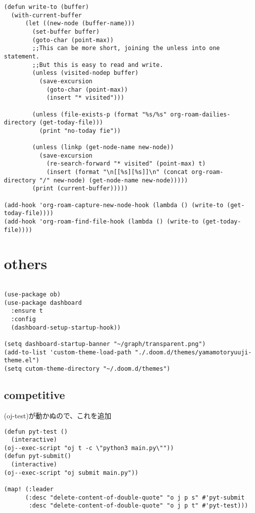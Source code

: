 \documentclass[11pt]{article}
\begin{document}
\begin{verbatim}
(defun write-to (buffer)
  (with-current-buffer
      (let ((new-node (buffer-name)))
        (set-buffer buffer)
        (goto-char (point-max))
        ;;This can be more short, joining the unless into one statement.
        ;;But this is easy to read and write.
        (unless (visited-nodep buffer)
          (save-excursion
            (goto-char (point-max))
            (insert "* visited")))

        (unless (file-exists-p (format "%s/%s" org-roam-dailies-directory (get-today-file)))
          (print "no-today fie"))

        (unless (linkp (get-node-name new-node))
          (save-excursion
            (re-search-forward "* visited" (point-max) t)
            (insert (format "\n[[%s][%s]]\n" (concat org-roam-directory "/" new-node) (get-node-name new-node)))))
        (print (current-buffer)))))

(add-hook 'org-roam-capture-new-node-hook (lambda () (write-to (get-today-file))))
(add-hook 'org-roam-find-file-hook (lambda () (write-to (get-today-file))))

\end{verbatim}

\section{others}
\label{sec:orgafd5b1a}
\begin{verbatim}

(use-package ob)
(use-package dashboard
  :ensure t
  :config
  (dashboard-setup-startup-hook))

(setq dashboard-startup-banner "~/graph/transparent.png")
(add-to-list 'custom-theme-load-path "./.doom.d/themes/yamamotoryuuji-theme.el")
(setq cutom-theme-directory "~/.doom.d/themes")
\end{verbatim}

\subsection{competitive}
\label{sec:orgfd00296}
(oj-test)が動かぬので、これを追加
\begin{verbatim}
(defun pyt-test ()
  (interactive)
(oj--exec-script "oj t -c \"python3 main.py\""))
(defun pyt-submit()
  (interactive)
(oj--exec-script "oj submit main.py"))

(map! (:leader
      (:desc "delete-content-of-double-quote" "o j p s" #'pyt-submit
       :desc "delete-content-of-double-quote" "o j p t" #'pyt-test)))
\end{verbatim}
\end{document}
